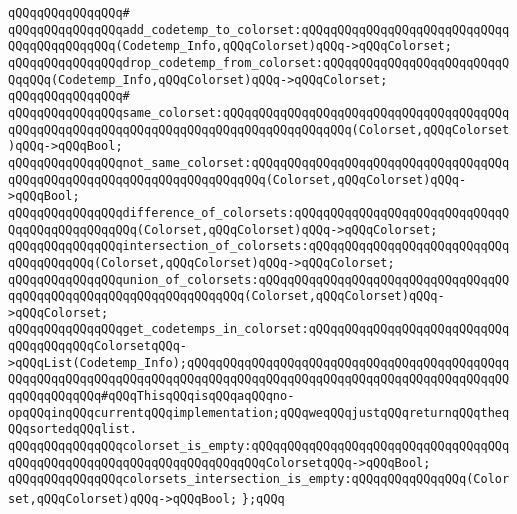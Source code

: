 \verb|qQQqqQQqqQQqqQQq#|\newline
\verb|qQQqqQQqqQQqqQQqadd_codetemp_to_colorset:qQQqqQQqqQQqqQQqqQQqqQQqqQQqqQQqqQQqqQQqqQQq(Codetemp_Info,qQQqColorset)qQQq->qQQqColorset;|\newline
\verb|qQQqqQQqqQQqqQQqdrop_codetemp_from_colorset:qQQqqQQqqQQqqQQqqQQqqQQqqQQqqQQq(Codetemp_Info,qQQqColorset)qQQq->qQQqColorset;|\newline
\verb|qQQqqQQqqQQqqQQq#|\newline
\verb|qQQqqQQqqQQqqQQqsame_colorset:qQQqqQQqqQQqqQQqqQQqqQQqqQQqqQQqqQQqqQQqqQQqqQQqqQQqqQQqqQQqqQQqqQQqqQQqqQQqqQQqqQQqqQQq(Colorset,qQQqColorset)qQQq->qQQqBool;|\newline
\verb|qQQqqQQqqQQqqQQqnot_same_colorset:qQQqqQQqqQQqqQQqqQQqqQQqqQQqqQQqqQQqqQQqqQQqqQQqqQQqqQQqqQQqqQQqqQQqqQQq(Colorset,qQQqColorset)qQQq->qQQqBool;|\newline
\newline
\verb|qQQqqQQqqQQqqQQqdifference_of_colorsets:qQQqqQQqqQQqqQQqqQQqqQQqqQQqqQQqqQQqqQQqqQQqqQQq(Colorset,qQQqColorset)qQQq->qQQqColorset;|\newline
\verb|qQQqqQQqqQQqqQQqintersection_of_colorsets:qQQqqQQqqQQqqQQqqQQqqQQqqQQqqQQqqQQqqQQq(Colorset,qQQqColorset)qQQq->qQQqColorset;|\newline
\verb|qQQqqQQqqQQqqQQqunion_of_colorsets:qQQqqQQqqQQqqQQqqQQqqQQqqQQqqQQqqQQqqQQqqQQqqQQqqQQqqQQqqQQqqQQqqQQq(Colorset,qQQqColorset)qQQq->qQQqColorset;|\newline
\newline
\verb|qQQqqQQqqQQqqQQqget_codetemps_in_colorset:qQQqqQQqqQQqqQQqqQQqqQQqqQQqqQQqqQQqqQQqColorsetqQQq->qQQqList(Codetemp_Info);qQQqqQQqqQQqqQQqqQQqqQQqqQQqqQQqqQQqqQQqqQQqqQQqqQQqqQQqqQQqqQQqqQQqqQQqqQQqqQQqqQQqqQQqqQQqqQQqqQQqqQQqqQQqqQQqqQQqqQQqqQQqqQQq#qQQqThisqQQqisqQQqaqQQqno-opqQQqinqQQqcurrentqQQqimplementation;qQQqweqQQqjustqQQqreturnqQQqtheqQQqsortedqQQqlist.|\newline
\verb|qQQqqQQqqQQqqQQqcolorset_is_empty:qQQqqQQqqQQqqQQqqQQqqQQqqQQqqQQqqQQqqQQqqQQqqQQqqQQqqQQqqQQqqQQqqQQqqQQqColorsetqQQq->qQQqBool;|\newline
\newline
\verb|qQQqqQQqqQQqqQQqcolorsets_intersection_is_empty:qQQqqQQqqQQqqQQq(Colorset,qQQqColorset)qQQq->qQQqBool;|\newline
\verb|};qQQq|\newline
\newline
\newline
\newline
